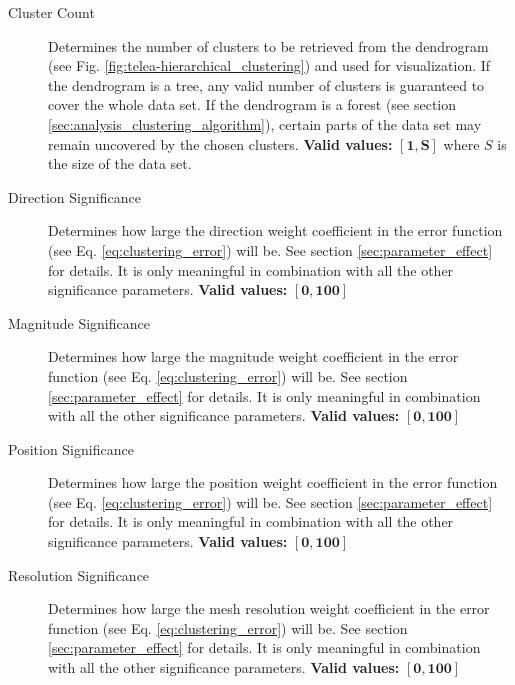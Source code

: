 \begin{description}
\item [Cluster Count] Determines the number of clusters to be retrieved from the dendrogram (see Fig. \ref{fig:telea-hierarchical_clustering}) and used for visualization. If the dendrogram is a tree, any valid number of clusters is guaranteed to cover the whole data set. If the dendrogram is a forest (see section \ref{sec:analysis_clustering_algorithm}), certain parts of the data set may remain uncovered by the chosen clusters. {\bf Valid values:} \(\bm{[1,S]}\) where \(S\) is the size of the data set.
\item [Direction Significance] Determines how large the direction weight coefficient in the error function (see Eq. \ref{eq:clustering_error}) will be. See section \ref{sec:parameter_effect} for details. It is only meaningful in combination with all the other significance parameters\footnotemark. {\bf Valid values:} \(\bm{[0,100]}\)
\item [Magnitude Significance] Determines how large the magnitude weight coefficient in the error function (see Eq. \ref{eq:clustering_error}) will be. See section \ref{sec:parameter_effect} for details. It is only meaningful in combination with all the other significance parameters\footnotemark. {\bf Valid values:} \(\bm{[0,100]}\)
\item [Position Significance] Determines how large the position weight coefficient in the error function (see Eq. \ref{eq:clustering_error}) will be. See section \ref{sec:parameter_effect} for details. It is only meaningful in combination with all the other significance parameters\footnotemark. {\bf Valid values:} \(\bm{[0,100]}\)
\item [Resolution Significance] Determines how large the mesh resolution weight coefficient in the error function (see Eq. \ref{eq:clustering_error}) will be. See section \ref{sec:parameter_effect} for details. It is only meaningful in combination with all the other significance parameters\footnotemark. {\bf Valid values:} \(\bm{[0,100]}\)
\end{description}

\addtocounter{footnote}{-4}

